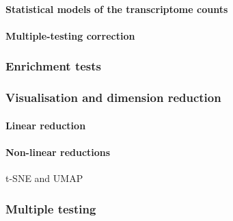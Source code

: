\paragraph{Statistical models of the transcriptome counts}
\paragraph{Multiple-testing correction}

\subsubsection{Enrichment tests}

\subsubsection{Visualisation and dimension reduction}
\paragraph{Linear reduction}
\paragraph{Non-linear reductions}
t-SNE and UMAP



\subsubsection{Multiple testing}

